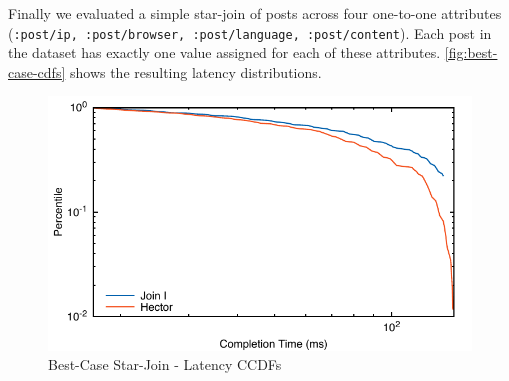 \documentclass[../catalog.tex]{subfiles}
\begin{document}
Finally we evaluated a simple star-join of posts across four
one-to-one attributes (\texttt{:post/ip, :post/browser,
  :post/language, :post/content}). Each post in the dataset has
exactly one value assigned for each of these
attributes. \autoref{fig:best-case-cdfs} shows the resulting latency
distributions.

\begin{figure}[h!]
  \includegraphics[width=1.0\linewidth]{results/best_case/out/all_cdfs}
  \caption{Best-Case Star-Join - Latency CCDFs}
  \label{fig:best-case-cdfs}
\end{figure}
\end{document}
